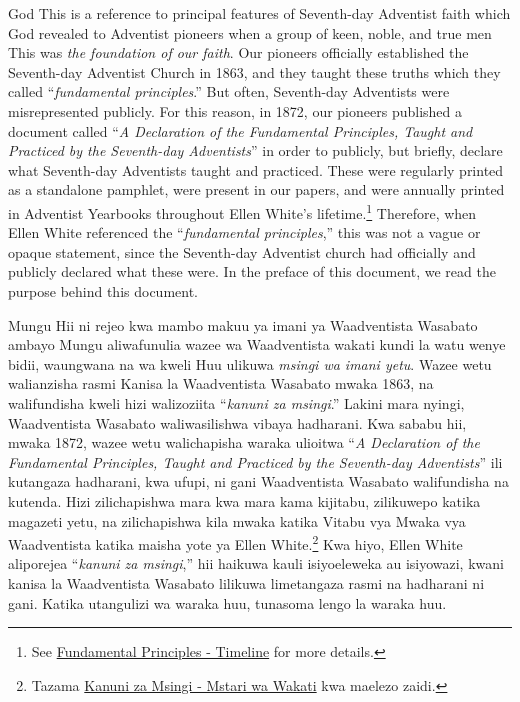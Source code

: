 God  This is a reference to principal features of Seventh-day Adventist faith which God revealed to Adventist pioneers  when a group of keen, noble, and true men  This was \textit{the foundation of our faith}. Our pioneers officially established the Seventh-day Adventist Church in 1863, and they taught these truths which they called “\textit{fundamental principles}.” But often, Seventh-day Adventists were misrepresented publicly. For this reason, in 1872, our pioneers published a document called “\textit{A Declaration of the Fundamental Principles, Taught and Practiced by the Seventh-day Adventists}” in order to publicly, but briefly, declare what  Seventh-day Adventists taught and practiced. These  were regularly printed as a standalone pamphlet, were present in our papers, and were annually printed in Adventist Yearbooks throughout Ellen White's lifetime.\footnote{See \hyperref[appendix:timeline]{Fundamental Principles - Timeline} for more details.} Therefore, when Ellen White referenced the “\textit{fundamental principles},” this was not a vague or opaque statement, since the Seventh-day Adventist church had officially and publicly declared what these  were. In the preface of this document, we read the purpose behind this document.


Mungu  Hii ni rejeo kwa mambo makuu ya imani ya Waadventista Wasabato ambayo Mungu aliwafunulia wazee wa Waadventista  wakati kundi la watu wenye bidii, waungwana na wa kweli  Huu ulikuwa \textit{msingi wa imani yetu}. Wazee wetu walianzisha rasmi Kanisa la Waadventista Wasabato mwaka 1863, na walifundisha kweli hizi walizoziita “\textit{kanuni za msingi}.” Lakini mara nyingi, Waadventista Wasabato waliwasilishwa vibaya hadharani. Kwa sababu hii, mwaka 1872, wazee wetu walichapisha waraka ulioitwa “\textit{A Declaration of the Fundamental Principles, Taught and Practiced by the Seventh-day Adventists}” ili kutangaza hadharani, kwa ufupi, ni  gani Waadventista Wasabato walifundisha na kutenda. Hizi  zilichapishwa mara kwa mara kama kijitabu, zilikuwepo katika magazeti yetu, na zilichapishwa kila mwaka katika Vitabu vya Mwaka vya Waadventista katika maisha yote ya Ellen White.\footnote{Tazama \hyperref[appendix:timeline]{Kanuni za Msingi - Mstari wa Wakati} kwa maelezo zaidi.} Kwa hiyo, Ellen White aliporejea “\textit{kanuni za msingi},” hii haikuwa kauli isiyoeleweka au isiyowazi, kwani kanisa la Waadventista Wasabato lilikuwa limetangaza rasmi na hadharani ni  gani. Katika utangulizi wa waraka huu, tunasoma lengo la waraka huu.


